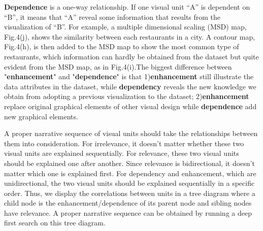 \noindent
\textbf{Dependence} is a one-way relationship. If one visual unit ``A'' is dependent on ``B'', it means that ``A'' reveal some information that results from the visualization of ``B''. For example, a multiple dimensional scaling (MSD) map, Fig.4(j), shows the similarity between each restaurants in a city. A contour map, Fig.4(h), is then added to the MSD map to show the most common type of restaurants, which information can hardly be obtained from the dataset but quite evident from the MSD map, as in Fig.4(i).The biggest difference between "\textbf{enhancement}" and "\textbf{dependence}" is that 1)\textbf{enhancement} still illustrate the data attributes in the dataset, while \textbf{dependency} reveals the new knowledge we obtain from adopting a previous visualization to the dataset; 2)\textbf{enhancement} replace original graphical elements of other visual design while \textbf{dependence} add new graphical elements.

A proper narrative sequence of visual units should take the relationships between them into consideration. For irrelevance, it doesn't matter whether these two visual units are explained sequentially. For relevance, these two visual units should be explained one after another. Since relevance is bidirectional, it doesn't matter which one is explained first. For dependency and enhancement, which are unidirectional, the two visual units should be explained sequentially in a specific order. 
 Thus, we display the correlations between units in a tree diagram where a child node is the enhancement/dependence of its parent node and sibling nodes have relevance. A proper narrative sequence can be obtained by running a deep first search on this tree diagram. 



